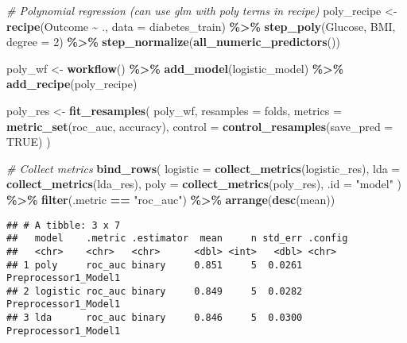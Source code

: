 \documentclass[
]{article}
\newenvironment{Shaded}{\begin{snugshade}}{\end{snugshade}}
\newcommand{\AttributeTok}[1]{\textcolor[rgb]{0.13,0.29,0.53}{#1}}
\newcommand{\CommentTok}[1]{\textcolor[rgb]{0.56,0.35,0.01}{\textit{#1}}}
\newcommand{\ConstantTok}[1]{\textcolor[rgb]{0.56,0.35,0.01}{#1}}
\newcommand{\DecValTok}[1]{\textcolor[rgb]{0.00,0.00,0.81}{#1}}
\newcommand{\FunctionTok}[1]{\textcolor[rgb]{0.13,0.29,0.53}{\textbf{#1}}}
\newcommand{\NormalTok}[1]{#1}
\newcommand{\OtherTok}[1]{\textcolor[rgb]{0.56,0.35,0.01}{#1}}
\newcommand{\SpecialCharTok}[1]{\textcolor[rgb]{0.81,0.36,0.00}{\textbf{#1}}}
\newcommand{\StringTok}[1]{\textcolor[rgb]{0.31,0.60,0.02}{#1}}
\begin{document}
\begin{Shaded}
\begin{Highlighting}[]
\CommentTok{\# Polynomial regression (can use glm with poly terms in recipe)}
\NormalTok{poly\_recipe }\OtherTok{\textless{}{-}} \FunctionTok{recipe}\NormalTok{(Outcome }\SpecialCharTok{\textasciitilde{}}\NormalTok{ ., }\AttributeTok{data =}\NormalTok{ diabetes\_train) }\SpecialCharTok{\%\textgreater{}\%}
  \FunctionTok{step\_poly}\NormalTok{(Glucose, BMI, }\AttributeTok{degree =} \DecValTok{2}\NormalTok{) }\SpecialCharTok{\%\textgreater{}\%}
  \FunctionTok{step\_normalize}\NormalTok{(}\FunctionTok{all\_numeric\_predictors}\NormalTok{())}

\NormalTok{poly\_wf }\OtherTok{\textless{}{-}} \FunctionTok{workflow}\NormalTok{() }\SpecialCharTok{\%\textgreater{}\%}
  \FunctionTok{add\_model}\NormalTok{(logistic\_model) }\SpecialCharTok{\%\textgreater{}\%}
  \FunctionTok{add\_recipe}\NormalTok{(poly\_recipe)}

\NormalTok{poly\_res }\OtherTok{\textless{}{-}} \FunctionTok{fit\_resamples}\NormalTok{(}
\NormalTok{  poly\_wf,}
  \AttributeTok{resamples =}\NormalTok{ folds,}
  \AttributeTok{metrics =} \FunctionTok{metric\_set}\NormalTok{(roc\_auc, accuracy),}
  \AttributeTok{control =} \FunctionTok{control\_resamples}\NormalTok{(}\AttributeTok{save\_pred =} \ConstantTok{TRUE}\NormalTok{)}
\NormalTok{)}

\CommentTok{\# Collect metrics}
\FunctionTok{bind\_rows}\NormalTok{(}
  \AttributeTok{logistic =} \FunctionTok{collect\_metrics}\NormalTok{(logistic\_res),}
  \AttributeTok{lda =} \FunctionTok{collect\_metrics}\NormalTok{(lda\_res),}
  \AttributeTok{poly =} \FunctionTok{collect\_metrics}\NormalTok{(poly\_res),}
  \AttributeTok{.id =} \StringTok{"model"}
\NormalTok{) }\SpecialCharTok{\%\textgreater{}\%}
  \FunctionTok{filter}\NormalTok{(.metric }\SpecialCharTok{==} \StringTok{"roc\_auc"}\NormalTok{) }\SpecialCharTok{\%\textgreater{}\%}
  \FunctionTok{arrange}\NormalTok{(}\FunctionTok{desc}\NormalTok{(mean))}
\end{Highlighting}
\end{Shaded}

\begin{verbatim}
## # A tibble: 3 x 7
##   model    .metric .estimator  mean     n std_err .config             
##   <chr>    <chr>   <chr>      <dbl> <int>   <dbl> <chr>               
## 1 poly     roc_auc binary     0.851     5  0.0261 Preprocessor1_Model1
## 2 logistic roc_auc binary     0.849     5  0.0282 Preprocessor1_Model1
## 3 lda      roc_auc binary     0.846     5  0.0300 Preprocessor1_Model1
\end{verbatim}
\end{document}
